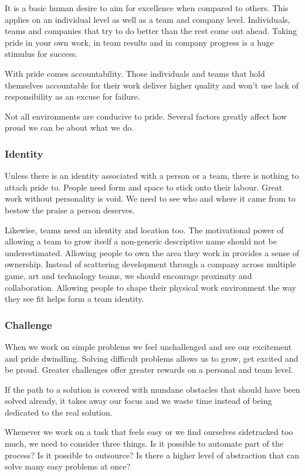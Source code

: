 \documentclass[twocolumn]{paper}
\begin{document}
It is a basic human desire to aim for excellence when compared to
others. This applies on an individual level as well as a team and
company level. Individuals, teams and companies that try to do
better than the rest come out ahead. Taking pride in your own work,
in team results and in company progress is a huge stimulus for
success.

With pride comes accountability. Those individuals and teams that
hold themselves accountable for their work deliver higher quality
and won't use lack of responsibility as an excuse for failure.

Not all environments are conducive to pride. Several factors greatly
affect how proud we can be about what we do.

\subsubsection{Identity}

Unless there is an identity associated with a person or a team,
there is nothing to attach pride to. People need form and space to
stick onto their labour. Great work without personality is void. We
need to see who and where it came from to bestow the praise a person
deserves.

Likewise, teams need an identity and location too. The motivational
power of allowing a team to grow itself a non-generic descriptive
name should not be underestimated. Allowing people to own the area
they work in provides a sense of ownership. Instead of scattering
development through a company across multiple game, art and
technology teams, we should encourage proximity and collaboration.
Allowing people to shape their physical work environment the way
they see fit helps form a team identity.

\subsubsection{Challenge}

When we work on simple problems we feel unchallenged and see our
excitement and pride dwindling. Solving difficult problems allows us
to grow, get excited and be proud. Greater challenges offer greater
rewards on a personal and team level.

If the path to a solution is covered with mundane obstacles that
should have been solved already, it takes away our focus and we
waste time instead of being dedicated to the real solution.

Whenever we work on a task that feels easy or we find ourselves
sidetracked too much, we need to consider three things. Is it
possible to automate part of the process? Is it possible to
outsource? Is there a higher level of abstraction that can solve
many easy problems at once?
\end{document}

